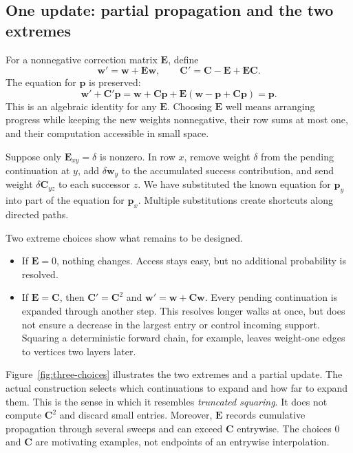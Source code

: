 \documentclass[11pt]{article}
\numberwithin{equation}{section}
\theoremstyle{definition}
\theoremstyle{remark}
\begin{document}
\subsection{One update: partial propagation and the two extremes}

For a nonnegative correction matrix \(\mathbf E\), define
\begin{equation}
 \mathbf w'=\mathbf w+\mathbf E\mathbf w,\qquad
 \mathbf C'=\mathbf C-\mathbf E+\mathbf E\mathbf C.
 \label{eq:overview-update}
\end{equation}
The equation for \(\mathbf p\) is preserved:
\[
 \mathbf w'+\mathbf C'\mathbf p
 =\mathbf w+\mathbf C\mathbf p+
       \mathbf E(\mathbf w-\mathbf p+\mathbf C\mathbf p)
 =\mathbf p.
\]
This is an algebraic identity for any \(\mathbf E\). Choosing \(\mathbf E\) well means arranging progress while keeping the new weights nonnegative, their row sums at most one, and their computation accessible in small space.

Suppose only \(\mathbf E_{xy}=\delta\) is nonzero. In row \(x\), remove weight \(\delta\) from the pending continuation at \(y\), add \(\delta\mathbf w_y\) to the accumulated success contribution, and send weight \(\delta\mathbf C_{yz}\) to each successor \(z\). We have substituted the known equation for \(\mathbf p_y\) into part of the equation for \(\mathbf p_x\). Multiple substitutions create shortcuts along directed paths.

Two extreme choices show what remains to be designed.
\begin{itemize}
\item If \(\mathbf E=0\), nothing changes. Access stays easy, but no additional probability is resolved.
\item If \(\mathbf E=\mathbf C\), then
\(\mathbf C'=\mathbf C^2\) and
\(\mathbf w'=\mathbf w+\mathbf C\mathbf w\).
Every pending continuation is expanded through another step. This resolves longer walks at once, but does not ensure a decrease in the largest entry or control incoming support. Squaring a deterministic forward chain, for example, leaves weight-one edges to vertices two layers later.
\end{itemize}

Figure~\ref{fig:three-choices} illustrates the two extremes and a partial update. The actual construction selects which continuations to expand and how far to expand them. This is the sense in which it resembles \emph{truncated squaring}. It does not compute \(\mathbf C^2\) and discard small entries. Moreover, \(\mathbf E\) records cumulative propagation through several sweeps and can exceed \(\mathbf C\) entrywise. The choices \(0\) and \(\mathbf C\) are motivating examples, not endpoints of an entrywise interpolation.
\end{document}
